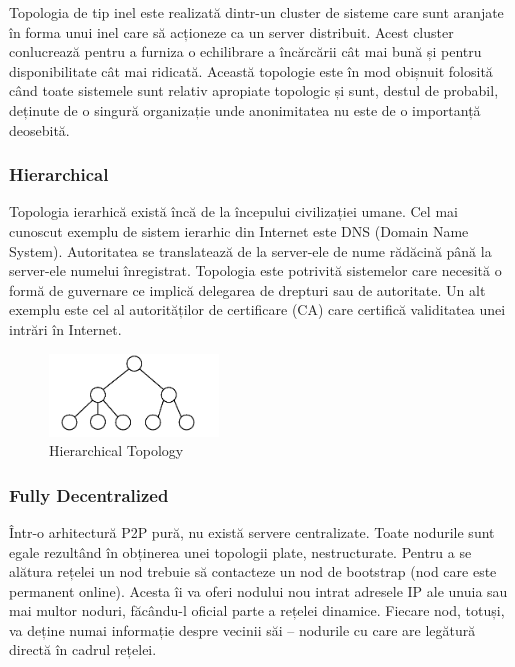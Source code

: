 Topologia de tip inel este realizată dintr-un cluster de sisteme care sunt
aranjate în forma unui inel care să acționeze ca un server distribuit. Acest
cluster conlucrează pentru a furniza o echilibrare a încărcării cât mai bună
și pentru disponibilitate cât mai ridicată. Această topologie este în mod
obișnuit folosită când toate sistemele sunt relativ apropiate topologic și
sunt, destul de probabil, deținute de o singură organizație unde anonimitatea
nu este de o importanță deosebită.

\subsubsection{Hierarchical}

Topologia ierarhică există încă de la începului civilizației umane. Cel mai
cunoscut exemplu de sistem ierarhic din Internet este DNS (Domain Name
System). Autoritatea se translatează de la server-ele de nume rădăcină până la
server-ele numelui înregistrat. Topologia este potrivită sistemelor care
necesită o formă de guvernare ce implică delegarea de drepturi sau de
autoritate. Un alt exemplu este cel al autorităților de certificare (CA) care
certifică validitatea unei intrări în Internet.

\begin{figure}
  \centering
  \includegraphics[width=0.4\textwidth]{src/img/p2p-systems/hierarchical}
  \caption{Hierarchical Topology}
  \label{fig:p2p-systems:hierarchical}
\end{figure}

\subsubsection{Fully Decentralized}

Într-o arhitectură P2P pură, nu există servere centralizate. Toate nodurile
sunt egale rezultând în obținerea unei topologii plate, nestructurate. Pentru
a se alătura rețelei un nod trebuie să contacteze un nod de bootstrap (nod
care este permanent online). Acesta îi va oferi nodului nou intrat adresele IP
ale unuia sau mai multor noduri, făcându-l oficial parte a rețelei dinamice.
Fiecare nod, totuși, va deține numai informație despre vecinii săi – nodurile
cu care are legătură directă în cadrul rețelei.

